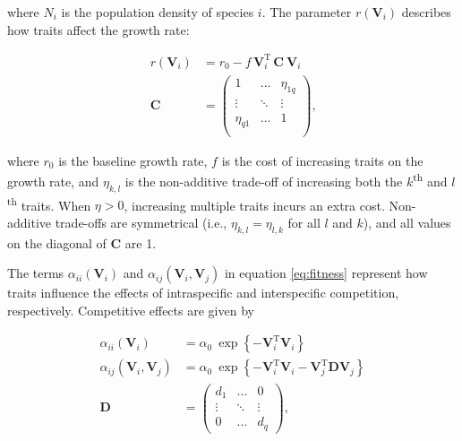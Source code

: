 \noindent where $N_i$ is the population density of  species $i$.
The parameter $r(\mathbf{V}_i)$ describes how traits affect
the growth rate:

\begin{equation} \label{eq:growth-rate}
\begin{split}
    r(\mathbf{V}_i) &= r_0 - f \, \mathbf{V}_i^{\textrm{T}} \, \mathbf{C} ~ \mathbf{V}_{i} \\
    \mathbf{C} &= \begin{pmatrix}
        1         & \ldots & \eta_{1q} \\
        \vdots    & \ddots & \vdots \\
        \eta_{q1} & \ldots & 1      \\
        \end{pmatrix}
    \textrm{,}
\end{split}
\end{equation}

\noindent where $r_0$ is the baseline growth rate,
$f$ is the cost of increasing traits on the growth rate, and
$\eta_{k,l}$ is the non-additive trade-off of increasing both the
$k$\textsuperscript{th} and $l$\textsuperscript{th} traits.
When $\eta > 0$, increasing multiple traits incurs an extra cost.
Non-additive trade-offs are symmetrical (i.e., $\eta_{k,l} = \eta_{l,k}$ for all
$l$ and $k$), and all values on the diagonal of $\mathbf{C}$ are 1.


The terms $\alpha_{ii}(\mathbf{V}_i)$ and
$\alpha_{ij}(\mathbf{V}_i, \mathbf{V}_j)$
in equation \ref{eq:fitness} represent how traits influence the effects
of intraspecific and interspecific competition, respectively.
Competitive effects are given by

\begin{equation} \label{eq:competition}
\begin{split}
    \alpha_{ii}(\mathbf{V}_i) &= \alpha_0 ~\exp \left\{
        - \mathbf{V}_i^{\textrm{T}}
        \mathbf{V}_i \right\} \\
    \alpha_{ij}(\mathbf{V}_i, \mathbf{V}_j) &= \alpha_0 ~\exp \left\{
        - \mathbf{V}_i^{\textrm{T}} \mathbf{V}_i -
        \mathbf{V}_j^{\textrm{T}} \mathbf{D} \mathbf{V}_j \right\} \\
    \mathbf{D} &= \begin{pmatrix}
        d_1     & \ldots    & 0 \\
        \vdots  & \ddots    & \vdots \\
        0       & \ldots    & d_q
        \end{pmatrix}
	\textrm{,}
\end{split}
\end{equation}

